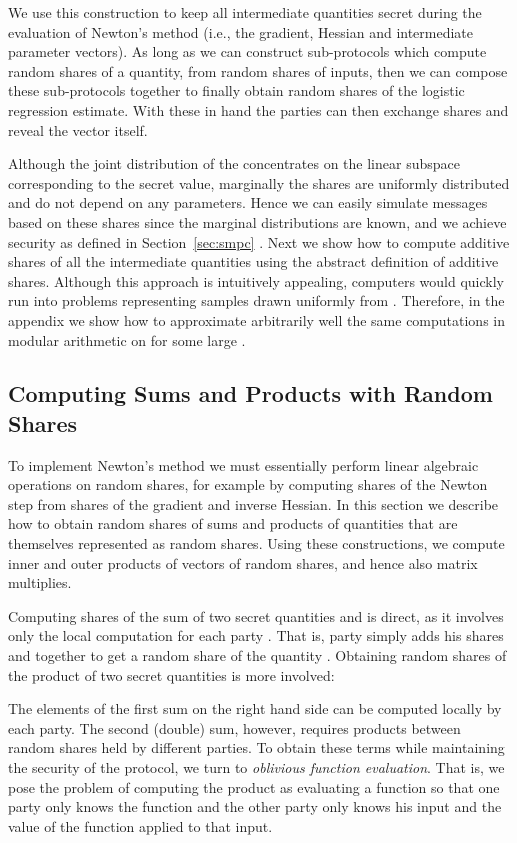 \documentclass[11pt]{article}
\begin{document}
We use this construction to keep all intermediate quantities secret during the evaluation of Newton's method (i.e., the gradient, Hessian and intermediate parameter vectors).  As long as we can construct sub-protocols which compute random shares of a quantity, from random shares of inputs, then we can compose these sub-protocols together to finally obtain random shares of the logistic regression estimate.  With these in hand the parties can then exchange shares and reveal the vector itself.

Although the joint distribution of the  concentrates on the linear subspace corresponding to the secret value, marginally the shares are uniformly distributed and do not  depend on any parameters.  Hence we can easily simulate messages based on these shares since the marginal distributions are known, and  we achieve security as defined in Section~\ref{sec:smpc} .  Next we show how to compute additive shares of all the intermediate quantities using the abstract definition of additive shares.  Although this approach is intuitively appealing, computers would quickly run into problems representing samples drawn uniformly from .  Therefore, in the appendix we show how to approximate arbitrarily well the same computations in modular arithmetic on  for some large .

\subsection{Computing Sums and Products with Random Shares}\label{sec_la}

To implement Newton's method we must essentially  perform linear algebraic operations on random shares, for example by computing shares of the Newton step from shares of the gradient and inverse Hessian.  In this section we describe how to obtain random shares of sums and products of quantities that are themselves represented as random shares.  Using these constructions, we   compute inner and outer products of vectors of random shares, and hence also matrix multiplies.

Computing shares of the sum of two secret quantities  and  is direct, as it involves only the local computation  for each party . That is, party  simply adds his shares  and  together to get a random share of the quantity .
Obtaining random shares of the product of two secret quantities is more involved:



\noindent  The elements of the first sum on the right hand side can be computed locally by each party.  The second (double) sum, however,  requires products between random shares held by different parties.  To obtain these terms while maintaining the security of the protocol, we turn to \emph{oblivious function evaluation}.  That is, we pose the problem of computing the product as evaluating a function so that one party only knows the function and the other party only knows his input and the value of the function applied to that input.
\end{document}
